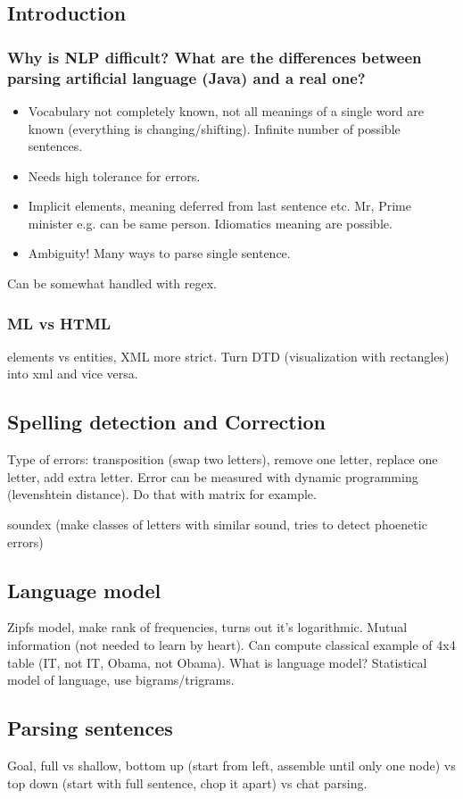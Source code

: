 \documentclass[11pt]{article}
\begin{document}
\subsection{Introduction}
\subsubsection{Why is NLP difficult? What are the differences between parsing artificial language (Java) and 
a real one?}
\begin{itemize}
	\item Vocabulary not completely known, not all meanings of a single word are known (everything is 
changing/shifting). Infinite number of possible sentences.
	\item Needs high tolerance for errors.
	\item Implicit elements, meaning deferred from last sentence etc. Mr, Prime minister e.g. 
	can be same person. Idiomatics meaning are possible. 
	\item Ambiguity! Many ways to parse single sentence.
\end{itemize}
Can be somewhat handled with regex. 
\subsubsection{ML vs HTML}
elements vs entities, XML more strict. Turn DTD (visualization with rectangles) 
into xml and vice versa.
\subsection{Spelling detection and Correction}
Type of errors: transposition (swap two letters), remove one letter, replace one letter, add extra letter. Error can be measured with dynamic programming (levenshtein distance). Do that
with matrix for example. 

soundex (make classes of letters with similar sound, tries to detect phoenetic
errors)

\subsection{Language model}
Zipfs model, make rank of frequencies, turns out it's logarithmic. 
Mutual information (not needed to learn by heart). Can compute classical example of 4x4 table
(IT, not IT, Obama, not Obama).
What is language model? Statistical model of language, use bigrams/trigrams. 

\subsection{Parsing sentences}
Goal, full vs shallow, bottom up (start from left, assemble until only one node) vs top down (start with full sentence, chop it apart) vs chat parsing. 
\end{document}
